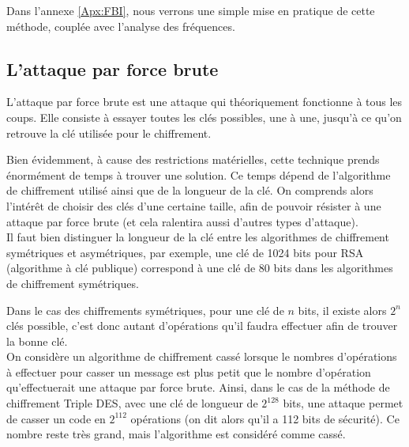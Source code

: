 Dans l'annexe \ref{Apx:FBI}, nous verrons une simple mise en pratique
de cette méthode, couplée avec l'analyse des fréquences.

\subsection{L'attaque par force brute}
L'attaque par force brute est une attaque qui théoriquement
fonctionne à tous les coups. Elle consiste à essayer toutes les
clés possibles, une à une, jusqu'à ce qu'on retrouve
la clé utilisée pour le chiffrement.

Bien évidemment, à cause des restrictions matérielles, cette
technique prends énormément de temps à trouver une solution. Ce
temps dépend de l'algorithme de chiffrement utilisé ainsi que de
la longueur de la clé. On comprends alors l'intérêt de choisir des
clés d'une certaine taille, afin de pouvoir résister à une attaque
par force brute (et cela ralentira aussi d'autres types
d'attaque).
\\

Il faut bien distinguer la longueur de la clé entre les
algorithmes de chiffrement symétriques et asymétriques, par
exemple, une clé de 1024 bits pour RSA (algorithme à clé
publique) correspond à une clé de 80 bits dans les algorithmes de
chiffrement symétriques. 

Dans le cas des chiffrements symétriques, pour une clé de $n$
bits, il existe alors $2^n$ clés possible, c'est donc autant
d'opérations qu'il faudra effectuer afin de trouver la bonne clé. 
\\

On considère un algorithme de chiffrement cassé lorsque le nombres
d'opérations à effectuer pour casser un message est plus
petit que le nombre d'opération qu'effectuerait une attaque par
force brute. Ainsi, dans le cas de la méthode de chiffrement
Triple DES, avec une clé de longueur de $2^{128}$ bits, une
attaque permet de casser un code en $2^{112}$ opérations (on dit
alors qu'il a 112 bits de sécurité). Ce nombre
reste très grand, mais l'algorithme est considéré comme cassé.
\\

